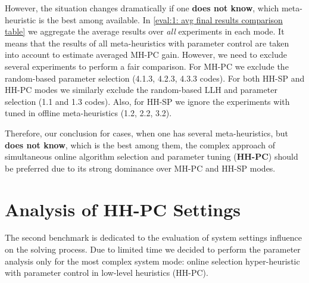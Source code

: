 However, the situation changes dramatically if one \textbf{does not know}, which meta-heuristic is the best among available. In \cref{eval:1: avg final results comparison table} we aggregate the average results over \emph{all} experiments in each mode. It means that the results of all meta-heuristics with parameter control are taken into account to estimate averaged MH-PC gain. However, we need to exclude several experiments to perform a fair comparison. For MH-PC we exclude the random-based parameter selection (4.1.3, 4.2.3, 4.3.3 codes). For both HH-SP and HH-PC modes we similarly exclude the random-based LLH and parameter selection (1.1 and 1.3 codes). Also, for HH-SP we ignore the experiments with tuned in offline meta-heuristics (1.2, 2.2, 3.2).

Therefore, our conclusion for cases, when one has several meta-heuristics, but \textbf{does not know}, which is the best among them, the complex approach of simultaneous online algorithm selection and parameter tuning (\textbf{HH-PC}) should be preferred due to its strong dominance over MH-PC and HH-SP modes.

\section{Analysis of HH-PC Settings}\label{eval:2}
The second benchmark is dedicated to the evaluation of system settings influence on the solving process.
Due to limited time we decided to perform the parameter analysis only for the most complex system mode: online selection hyper-heuristic with parameter control in low-level heuristics (HH-PC).


